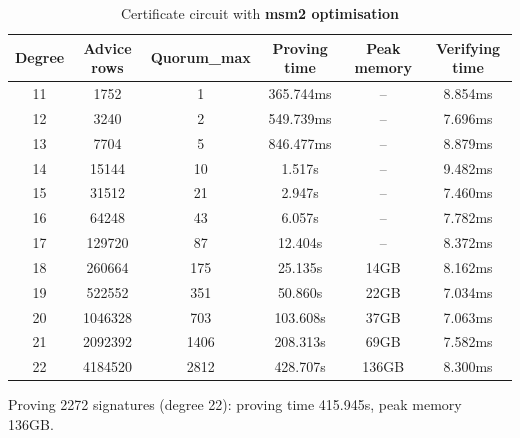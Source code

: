 \documentclass{article}
\begin{document}
\begin{table}[htbp]
\centering
\caption{Certificate circuit with \textbf{msm2 optimisation}}
\label{tab:cert-msm2}
\begin{tabular}{|c|c|c|c|c|c|}
\hline
\textbf{Degree} & \textbf{Advice rows} & \textbf{Quorum\_max} & \textbf{Proving time} & \textbf{Peak memory} & \textbf{Verifying time} \\
\hline
11 & 1752 & 1    & 365.744ms & --    & 8.854ms \\
12 & 3240 & 2    & 549.739ms & --    & 7.696ms \\
13 & 7704 & 5    & 846.477ms & --    & 8.879ms \\
14 & 15144 & 10  & 1.517s    & --    & 9.482ms \\
15 & 31512 & 21  & 2.947s    & --    & 7.460ms \\
16 & 64248 & 43  & 6.057s    & --    & 7.782ms \\
17 & 129720 & 87 & 12.404s   & --    & 8.372ms \\
18 & 260664 & 175 & 25.135s  & 14GB  & 8.162ms \\
19 & 522552 & 351 & 50.860s  & 22GB  & 7.034ms \\
20 & 1046328 & 703 & 103.608s & 37GB & 7.063ms \\
21 & 2092392 & 1406 & 208.313s & 69GB & 7.582ms \\
22 & 4184520 & 2812 & 428.707s & 136GB & 8.300ms \\
\hline
\end{tabular}
\vspace{0.3em}

\footnotesize{Proving 2272 signatures (degree 22): proving time 415.945s, peak memory 136GB.}
\end{table}
\end{document}
